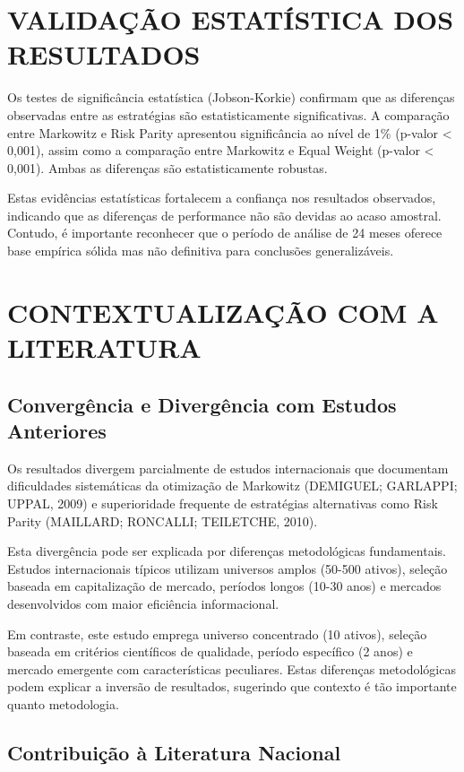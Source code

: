 \section{VALIDAÇÃO ESTATÍSTICA DOS RESULTADOS}

Os testes de significância estatística (Jobson-Korkie) confirmam que as diferenças observadas entre as estratégias são estatisticamente significativas. A comparação entre Markowitz e Risk Parity apresentou significância ao nível de 1\% (p-valor < 0,001), assim como a comparação entre Markowitz e Equal Weight (p-valor < 0,001). Ambas as diferenças são estatisticamente robustas.

Estas evidências estatísticas fortalecem a confiança nos resultados observados, indicando que as diferenças de performance não são devidas ao acaso amostral. Contudo, é importante reconhecer que o período de análise de 24 meses oferece base empírica sólida mas não definitiva para conclusões generalizáveis.

\section{CONTEXTUALIZAÇÃO COM A LITERATURA}

\subsection{Convergência e Divergência com Estudos Anteriores}

Os resultados divergem parcialmente de estudos internacionais que documentam dificuldades sistemáticas da otimização de Markowitz (DEMIGUEL; GARLAPPI; UPPAL, 2009) e superioridade frequente de estratégias alternativas como Risk Parity (MAILLARD; RONCALLI; TEILETCHE, 2010).

Esta divergência pode ser explicada por diferenças metodológicas fundamentais. Estudos internacionais típicos utilizam universos amplos (50-500 ativos), seleção baseada em capitalização de mercado, períodos longos (10-30 anos) e mercados desenvolvidos com maior eficiência informacional.

Em contraste, este estudo emprega universo concentrado (10 ativos), seleção baseada em critérios científicos de qualidade, período específico (2 anos) e mercado emergente com características peculiares. Estas diferenças metodológicas podem explicar a inversão de resultados, sugerindo que contexto é tão importante quanto metodologia.

\subsection{Contribuição à Literatura Nacional}

